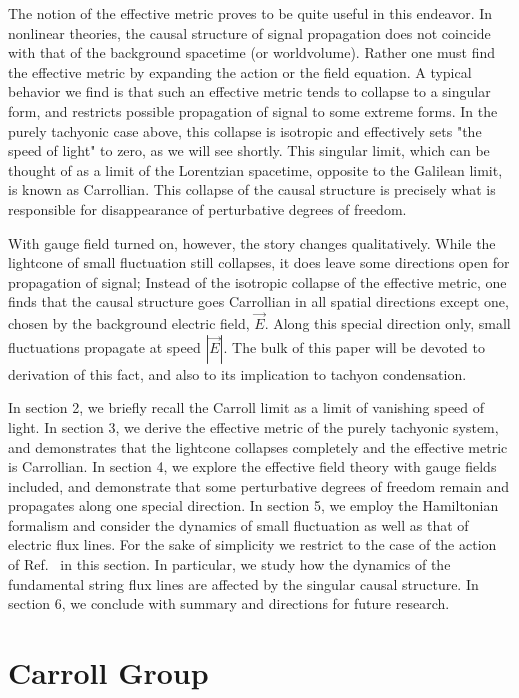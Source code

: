 \documentclass[a4paper,12pt]{article}
\begin{document}
The notion of the effective metric proves to be quite
useful in this endeavor. In nonlinear theories, the causal structure of 
signal propagation does not coincide with that of the background 
spacetime (or worldvolume). Rather one must find the effective 
metric by expanding the action or the field equation. A typical 
behavior we find is that such an effective metric tends to collapse 
to a singular form, and restricts possible propagation of signal 
to some extreme forms. In the purely tachyonic case above, this
collapse is isotropic and effectively sets "the speed of light"
to zero, as we will see shortly. This singular limit, which
can be thought of as a limit of the Lorentzian spacetime, opposite
to the Galilean limit, is known as Carrollian. This collapse
of the causal structure is precisely what is responsible for
disappearance of perturbative degrees of freedom.

With gauge field turned on, however, the story changes qualitatively.
While the lightcone of small fluctuation still collapses, it does
leave some directions open for propagation of signal; Instead of
the isotropic collapse of the effective metric, one finds that
the causal structure goes Carrollian in all spatial directions except 
one, chosen by the background electric field, $\vec E$. Along this
special direction only, small fluctuations propagate at speed 
$|\vec E|$. 
The bulk of this paper will be devoted to derivation of this fact, and
also to its implication to tachyon condensation.

In section 2, we briefly recall the Carroll limit as a limit of 
vanishing speed of light. In section 3, we derive the effective
metric of the purely tachyonic system, and demonstrates that the
lightcone collapses completely and the effective metric is 
Carrollian. In section 4, we explore the effective
field theory with gauge fields included, and demonstrate that
some perturbative degrees of freedom remain and propagates along
one special direction. In section 5, we employ the Hamiltonian formalism  
and consider the dynamics of small fluctuation as well as that of 
electric flux lines. For the sake of simplicity we restrict to the
case of the action of Ref.~\cite{bergshoeff} in this section.
In particular, we study how the dynamics of the fundamental string 
flux lines are affected by the singular causal structure.
In section 6, we conclude with summary and directions for future
research.


\section{Carroll Group}
\end{document}
